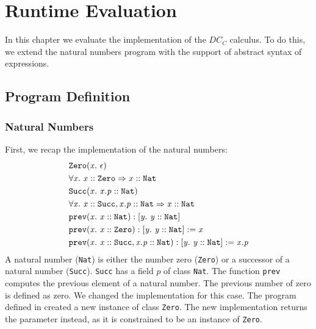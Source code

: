 \chapter{Runtime Evaluation} %
In this chapter we evaluate the implementation of the $DC_C$ calculus.
To do this, we extend the natural numbers program with the support of
abstract syntax of expressions.

\section{Program Definition}
\subsection{Natural Numbers}
First, we recap the implementation of the natural numbers:
\begin{align*}
&\mathit{\texttt{Zero}}(\mathit{x}.\ \mathit{\epsilon})\\
& \forall \mathit{x}.\ \mathit{\mathit{x} :: \mathit{\texttt{Zero}}} \Rightarrow \mathit{\mathit{x} :: \mathit{\texttt{Nat}}}\\
&\mathit{\texttt{Succ}}(\mathit{x}.\ \mathit{\mathit{x.p} :: \mathit{\texttt{Nat}}})\\
& \forall \mathit{x}.\ \mathit{\mathit{x} :: \mathit{\texttt{Succ}}, \mathit{x.p} :: \mathit{\texttt{Nat}}} \Rightarrow \mathit{\mathit{x} :: \mathit{\texttt{Nat}}}\\
&\mathit{\texttt{prev}}(\mathit{x}.\ \mathit{\mathit{x} :: \mathit{\texttt{Nat}}}): \mathit{[y.\ \mathit{\mathit{y} :: \mathit{\texttt{Nat}}}]}\\
&\mathit{\texttt{prev}}(\mathit{x}.\ \mathit{\mathit{x} :: \mathit{\texttt{Zero}}}): \mathit{[y.\ \mathit{\mathit{y} :: \mathit{\texttt{Nat}}}]} := \mathit{x}\\
&\mathit{\texttt{prev}}(\mathit{x}.\ \mathit{\mathit{x} :: \mathit{\texttt{Succ}}, \mathit{x.p} :: \mathit{\texttt{Nat}}}): \mathit{[y.\ \mathit{\mathit{y} :: \mathit{\texttt{Nat}}}]} := \mathit{x.p}
\end{align*}
%
A natural number (\texttt{Nat}) is either the number zero (\texttt{Zero})
or a successor of a natural number (\texttt{Succ}).
\texttt{Succ} has a field $p$ of class \texttt{Nat}.
The function \texttt{prev} computes the previous element of a natural number.
The previous number of zero is defined as zero.
We changed the implementation for this case.
The program defined in  created a new
instance of class \texttt{Zero}.
The new implementation returns the parameter instead,
as it is constrained to be an instance of \texttt{Zero}.

